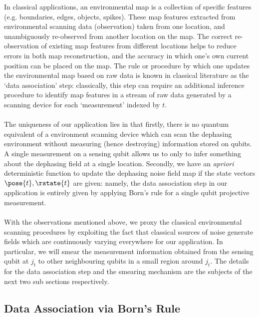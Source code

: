 In classical applications,  an environmental map is a collection of specific features (e.g. boundaries, edges, objects, spikes). These map features extracted from environmental scanning data (observation) taken from one location, and unambiguously re-observed from another location on the map. The correct re-observation of existing map features from different locations helps to reduce errors in both map reconstruction, and the accuracy in which one's own current position can be placed on the map. The rule or procedure by which one updates the environmental map based on raw data is known in classical literature as the `data association' step: classically, this step can require an additional inference procedure to identify map features in a stream of raw data generated by a scanning device for each `measurement' indexed by $t$.\\
\\
The uniqueness of our application lies in that firstly, there is no quantum equivalent of a environment scanning device which can scan the dephasing environment without measuring (hence destroying) information stored on qubits. A single measurement on a sensing qubit allows us to only to infer something about the dephasing field at a single location. Secondly, we have an \textit{apriori}  deterministic function to update the dephasing noise field map if the state vectors $\pose{t}, \rstate{t}$ are given: namely, the data association step in our application is entirely given by applying Born's rule for a single qubit projective measurement. \\
\\
With the observations mentioned above, we proxy the classical environmental scanning procedures by exploiting the fact that classical sources of noise generate fields which are continuously varying everywhere for our application. In particular,  we will smear the measurement information obtained from the sensing qubit at $j_t$ to other neighbouring qubits in a small region around $j_t$. The details for the data association step and the smearing mechanism are the subjects of the next two sub sections respectively. 

\subsection{Data Association via Born's Rule}


